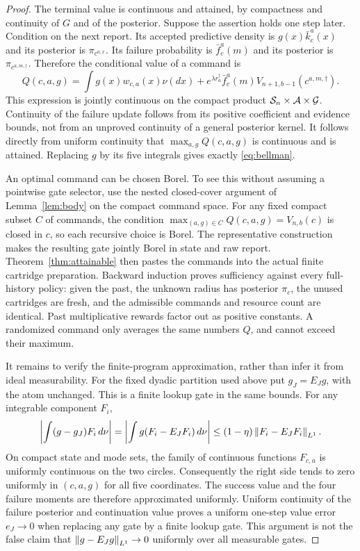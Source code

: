 \begin{proof}
The terminal value is continuous and attained, by compactness and continuity
of $G$ and of the posterior. Suppose the assertion holds one step later.
Condition on the next report. Its accepted predictive density is
$g(x)\bar k_c^a(x)$ and its posterior is $\pi_{c^{a,x}}$. Its failure
probability is $\bar f_c^a(m)$ and its posterior is
$\pi_{c^{a,m,\dagger}}$. Therefore the conditional value of a command is
\[
 Q(c,a,g)=\int g(x)w_{c,a}(x)\nu(dx)
  +e^{\lambda r_a^\dagger}\bar f_c^a(m)
                         V_{n+1,b-1}(c^{a,m,\dagger}).
\]
This expression is jointly continuous on the compact product
$\mathcal S_n\times\mathcal A\times\mathcal G$. Continuity of the failure update follows from
its positive coefficient and evidence bounds, not from an unproved
continuity of a general posterior kernel. It follows directly from uniform
continuity that $\max_{a,g}Q(c,a,g)$ is continuous and is attained. Replacing
$g$ by its five integrals gives exactly \eqref{eq:bellman}.

An optimal command can be chosen Borel. To see this without assuming a
pointwise gate selector, use the nested closed-cover argument of
Lemma~\ref{lem:body} on the compact command space. For any fixed compact
subset $C$ of commands, the condition
$\max_{(a,g)\in C}Q(c,a,g)=V_{n,b}(c)$ is closed in $c$, so each recursive
choice is Borel. The representative construction makes the resulting gate
jointly Borel in state and raw report. Theorem~\ref{thm:attainable} then
pastes the commands into the actual finite cartridge preparation. Backward
induction proves sufficiency against every full-history policy: given the
past, the unknown radius has posterior $\pi_c$, the unused cartridges are
fresh, and the admissible commands and resource count are identical.
Past multiplicative rewards factor out as positive constants. A randomized
command only averages the same numbers $Q$, and cannot exceed their maximum.

It remains to verify the finite-program approximation, rather than infer
it from ideal measurability. For the fixed dyadic partition used above put
$g_J=E_Jg$, with the atom unchanged. This is a finite lookup gate in the
same bounds. For any integrable component $F_i$,
\[
 \left|\int(g-g_J)F_i\,d\nu\right|
 =\left|\int g(F_i-E_JF_i)\,d\nu\right|
 \le(1-\eta)\left\lVert F_i-E_JF_i\right\rVert_{L^1}.
\]
On compact state and mode sets, the family of continuous functions
$F_{c,a}$ is uniformly continuous on the two circles. Consequently the
right side tends to zero uniformly in $(c,a,g)$ for all five coordinates.
The success value and the four failure moments are therefore approximated
uniformly. Uniform continuity of the failure posterior and continuation
value proves a uniform one-step value error $e_J\to0$ when replacing any
gate by a finite lookup gate. This argument is not the false claim that
$\left\lVert g-E_Jg\right\rVert_{L^1}\to0$ uniformly over all measurable gates.


\end{proof}
